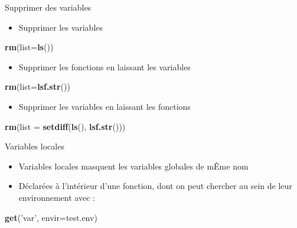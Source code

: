 \documentclass[
  ignorenonframetext,
]{beamer}
\newenvironment{Shaded}{\begin{snugshade}}{\end{snugshade}}
\newcommand{\DataTypeTok}[1]{\textcolor[rgb]{0.13,0.29,0.53}{#1}}
\newcommand{\KeywordTok}[1]{\textcolor[rgb]{0.13,0.29,0.53}{\textbf{#1}}}
\newcommand{\NormalTok}[1]{#1}
\newcommand{\StringTok}[1]{\textcolor[rgb]{0.31,0.60,0.02}{#1}}
\providecommand{\tightlist}{%
  \setlength{\itemsep}{0pt}\setlength{\parskip}{0pt}}
\begin{document}
\begin{frame}[fragile]{Supprimer des variables}
\protect\hypertarget{supprimer-des-variables}{}

\begin{itemize}
\tightlist
\item
  Supprimer les variables
\end{itemize}

\begin{Shaded}
\begin{Highlighting}[]
 \KeywordTok{rm}\NormalTok{(}\DataTypeTok{list=}\KeywordTok{ls}\NormalTok{())}
\end{Highlighting}
\end{Shaded}

\begin{itemize}
\tightlist
\item
  Supprimer les fonctions en laissant les variables
\end{itemize}

\begin{Shaded}
\begin{Highlighting}[]
  \KeywordTok{rm}\NormalTok{(}\DataTypeTok{list=}\KeywordTok{lsf.str}\NormalTok{())}
\end{Highlighting}
\end{Shaded}

\begin{itemize}
\tightlist
\item
  Supprimer les variables en laissant les fonctions
\end{itemize}

\begin{Shaded}
\begin{Highlighting}[]
  \KeywordTok{rm}\NormalTok{(}\DataTypeTok{list =} \KeywordTok{setdiff}\NormalTok{(}\KeywordTok{ls}\NormalTok{(), }\KeywordTok{lsf.str}\NormalTok{()))}
\end{Highlighting}
\end{Shaded}

\end{frame}

\begin{frame}[fragile]{Variables locales}
\protect\hypertarget{variables-locales}{}

\begin{itemize}
\tightlist
\item
  Variables locales masquent les variables globales de mÊme nom
\item
  Déclarées à l'intérieur d'une fonction, dont on peut chercher au sein
  de leur environnement avec :
\end{itemize}

\begin{Shaded}
\begin{Highlighting}[]
\KeywordTok{get}\NormalTok{(}\StringTok{'var'}\NormalTok{, }\DataTypeTok{envir=}\NormalTok{test.env)}
\end{Highlighting}
\end{Shaded}

\end{frame}
\end{document}

